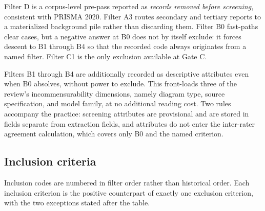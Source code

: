 Filter D is a corpus-level pre-pass reported as \textit{records removed before screening}, consistent with PRISMA 2020. Filter A3 routes secondary and tertiary reports to a materialized background pile rather than discarding them. Filter B0 fast-paths clear cases, but a negative answer at B0 does not by itself exclude: it forces descent to B1 through B4 so that the recorded code always originates from a named filter. Filter C1 is the only exclusion available at Gate C.

Filters B1 through B4 are additionally recorded as descriptive attributes even when B0 absolves, without power to exclude. This front-loads three of the review's incommensurability dimensions, namely diagram type, source specification, and model family, at no additional reading cost. Two rules accompany the practice: screening attributes are provisional and are stored in fields separate from extraction fields, and attributes do not enter the inter-rater agreement calculation, which covers only B0 and the named criterion.

\subsection{Inclusion criteria}

Inclusion codes are numbered in filter order rather than historical order. Each inclusion criterion is the positive counterpart of exactly one exclusion criterion, with the two exceptions stated after the table.

